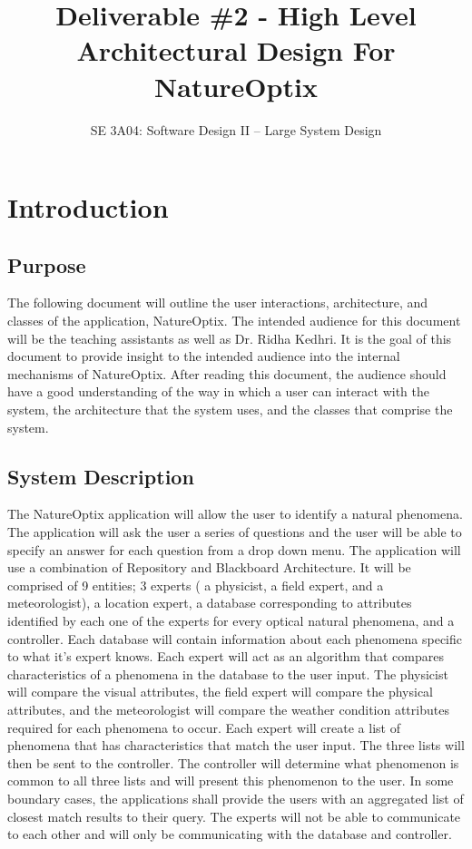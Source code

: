 \documentclass[]{article}
\title{Deliverable \#2 - High Level Architectural Design For NatureOptix}
\author{SE 3A04: Software Design II -- Large System Design}
\date{}
\begin{document}
\maketitle	

\section{Introduction}
\label{sec:introduction}



\subsection{Purpose}
\label{sub:purpose}
The following document will outline the user interactions, architecture, and classes of the application, NatureOptix.  The intended audience for this document will be the teaching assistants as well as Dr. Ridha Kedhri. It is the goal of this document to provide insight to the intended audience into the internal mechanisms of NatureOptix. After reading this document, the audience should have a good understanding of the way in which a user can interact with the system, the architecture that the system uses, and the classes that comprise the system. 

\subsection{System Description}
\label{sub:system_description}
The NatureOptix application will allow the user to identify a natural phenomena. The application will ask the user a series of questions and the user will be able to specify an answer for each question from a drop down menu. The application will use a combination of Repository and Blackboard Architecture. It will be comprised of 9 entities; 3 experts ( a physicist, a field expert, and a meteorologist), a location expert, a database corresponding to attributes identified by each one of the experts for every optical natural phenomena, and a controller. Each database will contain information about each phenomena specific to what it's expert knows. Each expert will act as an algorithm that compares characteristics of a phenomena in the database to the user input. The physicist will compare the visual attributes, the field expert will compare the physical attributes, and the meteorologist will compare the weather condition attributes required for each phenomena to occur. Each expert will create a list of phenomena that has characteristics that match the user input. The three lists will then be sent to the controller. The controller will determine what phenomenon is common to all three lists and will present this phenomenon to the user. In some boundary cases, the applications shall provide the users with an aggregated list of closest match results to their query. The experts will not be able to communicate to each other and will only be communicating with the database and controller. 
\end{document}
